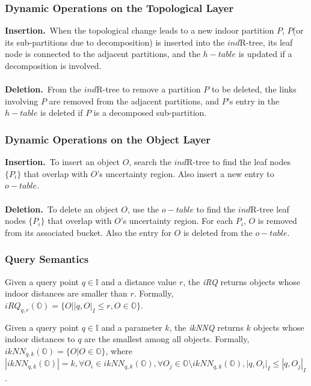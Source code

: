 
\begin{frame}
\frametitle{Dynamic Operations on the Topological Layer}

\textbf{Insertion.}~\textrm{When the topological change leads to a new indoor partition $P$, $P$(or its sub-partitions due to decomposition) is inserted into the $ind$R-tree, its leaf node is connected to the adjacent partitions, and the $h-table$ is updated if a decomposition is involved.}\\~\\

\textbf{Deletion.}~\textrm{From the $ind$R-tree to remove a partition $P$ to be deleted, the links involving $P$ are removed from the adjacent partitions, and $P$'s entry in the $h-table$ is deleted if $P$ is a decomposed sub-partition.}

\end{frame}


\begin{frame}
\frametitle{Dynamic Operations on the Object Layer}

\textbf{Insertion.}~\textrm{To insert an object $O$, search the $ind$R-tree to find the leaf nodes $\{ P_i \}$ that overlap with $O$'s uncertainty region. Also insert a new entry to $o-table$.}\\~\\

\textbf{Deletion.}~\textrm{To delete an object $O$, use the $o-table$ to find the $ind$R-tree leaf nodes $\{ P_i \}$ that overlap with $O$'s uncertainty region. For each $P_i$, $O$ is removed from its associated bucket. Also the entry for $O$ is deleted from the $o-table$.}

\end{frame}


\begin{frame}
\frametitle{Query Semantics}

\begin{definition}
  Given a query point $q \in \mathbb{I}$ and a distance value $r$, the \emph{iRQ} returns objects whose indoor distances are smaller than $r$. Formally, $iRQ_{q,r}(\mathbb{O}) = \{ O | |q,O|_I \leq r, O \in \mathbb{O}\}$.
\end{definition}

\begin{definition}
  Given a query point $q \in \mathbb{I}$ and a parameter $k$, the \emph{ikNNQ} returns $k$ objects whose indoor distances to $q$ are the smallest among all objects. Formally, $ikNN_{q,k}(\mathbb{O}) = \{ O | O \in \mathbb{O}\}$, where $|ikNN_{q,k}(\mathbb{O})| = k, \forall O_i \in ikNN_{q,k}(\mathbb{O}), \forall O_j \in \mathbb{O} \setminus ikNN_{q,k}(\mathbb{O}), |q,O_i|_I \leq |q,O_j|_I$.
\end{definition}

\end{frame}

